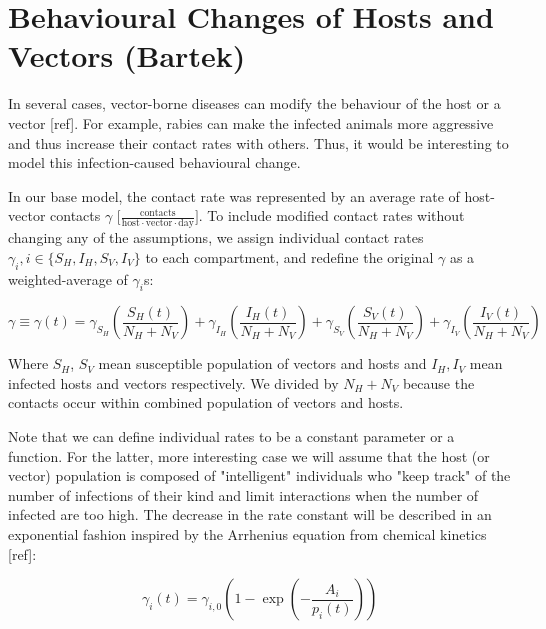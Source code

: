 \begingroup
\setlength{\parindent}{0pt}
\setlength{\parskip}{0.5\baselineskip}
\section{Behavioural Changes of Hosts and Vectors (Bartek)}
In several cases, vector-borne diseases can modify the behaviour of the host or a vector [ref]. For example, rabies can make the infected animals more aggressive and thus increase their contact rates with others. Thus, it would be interesting to model this infection-caused behavioural change. 

In our base model, the contact rate was represented by an average rate of host-vector contacts $\gamma \, \, \mathrm{[\frac{contacts}{host \cdot vector \cdot day}}]$. To include modified contact rates without changing any of the assumptions, we assign individual contact rates $\gamma_i, i \in\{S_H, I_H, S_V, I_V\}$ to each compartment, and redefine the original $\gamma$ as a weighted-average of $\gamma_i$s:

\begin{equation}
    \gamma \equiv\gamma(t) = \gamma_{S_H} \left( \frac{S_H(t)}{N_H+ N_V}  \right) + \gamma_{I_H} \left( \frac{I_H(t)}{N_H + N_V} \right) + \gamma_{S_V} \left( \frac{S_V(t)}{N_H + N_V} \right) + \gamma_{I_V} \left( \frac{I_V(t)}{N_H + N_V} \right)
\end{equation}

Where $S_H$, $S_V$ mean susceptible population of vectors and hosts and $I_H, I_V$ mean infected hosts and vectors respectively. We divided by $N_H + N_V$ because the contacts occur within combined population of vectors and hosts. 


Note that we can define individual rates to be a constant parameter or a function. For the latter, more interesting case we will assume that the host 
(or vector) population is composed of "intelligent" individuals who "keep track" of the number of infections of their kind and limit interactions when the number of infected are too high. The decrease in the rate constant will be described in an exponential fashion inspired by the Arrhenius equation from chemical kinetics [ref]:

\begin{equation}
\gamma_i(t) = \gamma_{i, 0}\left(1 - \exp{\left({-\frac{A_i}{p_i(t)}}\right)} \right)
\end{equation}

